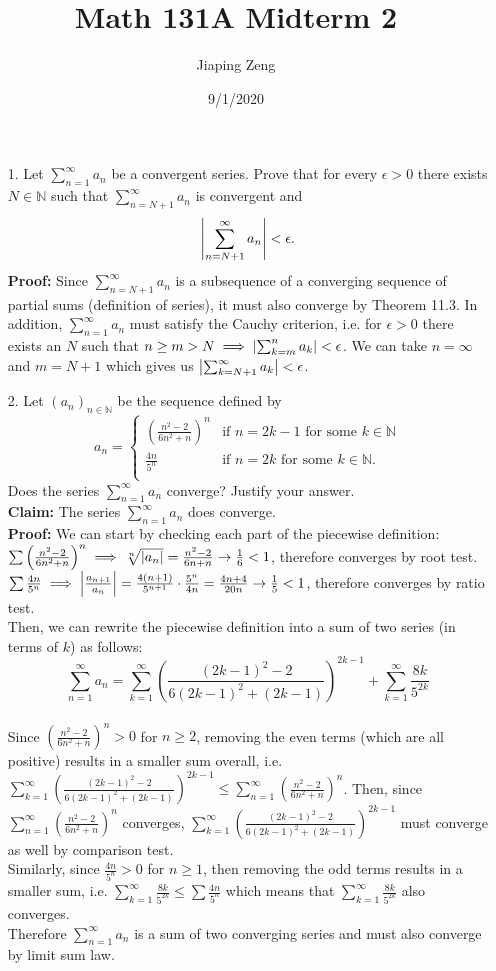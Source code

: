 \documentclass{article}
\title{Math 131A Midterm 2}
\author{Jiaping Zeng}
\date{9/1/2020}
\begin{document}
\begin{itemize}
    \item [1.] Let $\sum_{n=1}^\infty a_n$ be a convergent series. Prove that for every $\epsilon>0$ there exists $N\in\mathbb{N}$ such that $\sum_{n=N+1}^\infty a_n$ is convergent and \[\abs{\sum_{n=N+1}^\infty a_n}<\epsilon.\]
          \textbf{Proof: } Since $\sum_{n=N+1}^\infty a_n$ is a subsequence of a converging sequence of partial sums (definition of series), it must also converge by Theorem 11.3. In addition, $\sum_{n=1}^\infty a_n$ must satisfy the Cauchy criterion, i.e. for $\epsilon>0$ there exists an $N$ such that $n\geq m>N\implies\abs{\sum_{k=m}^na_k}<\epsilon$. We can take $n=\infty$ and $m=N+1$ which gives us $\abs{\sum_{k=N+1}^\infty a_k}<\epsilon$.
\end{itemize}
\newpage
\begin{itemize}
    \item [2.] Let $(a_n)_{n\in\mathbb{N}}$ be the sequence defined by \[a_n=\begin{cases}\left(\frac{n^2-2}{6n^2+n}\right)^n & \text{if } n=2k-1\text{ for some }k\in\mathbb{N} \\\frac{4n}{5^n} & \text{if } n=2k\text{ for some }k\in\mathbb{N}.\\\end{cases}\] Does the series $\sum_{n=1}^\infty a_n$ converge? Justify your answer.\\
          \textbf{Claim: } The series $\sum_{n=1}^\infty a_n$ does converge.\\
          \textbf{Proof: } We can start by checking each part of the piecewise definition:\\$\sum\left(\frac{n^2-2}{6n^2+n}\right)^n\implies\sqrt[n]{\abs{a_n}}=\frac{n^2-2}{6n+n}\rightarrow\frac{1}{6}<1$, therefore converges by root test.\\$\sum\frac{4n}{5^n}\implies\abs{\frac{a_{n+1}}{a_n}}=\frac{4(n+1)}{5^{n+1}}\cdot\frac{5^n}{4n}=\frac{4n+4}{20n}\rightarrow\frac{1}{5}<1$, therefore converges by ratio test.\\Then, we can rewrite the piecewise definition into a sum of two series (in terms of $k$) as follows:\\\[\sum_{n=1}^\infty a_n=\sum_{k=1}^\infty \left(\frac{(2k-1)^2-2}{6(2k-1)^2+(2k-1)}\right)^{2k-1}+\sum_{k=1}^\infty\frac{8k}{5^{2k}}\]\\Since $\left(\frac{n^2-2}{6n^2+n}\right)^n>0$ for $n\geq 2$, removing the even terms (which are all positive) results in a smaller sum overall, i.e. $\sum_{k=1}^\infty\left(\frac{(2k-1)^2-2}{6(2k-1)^2+(2k-1)}\right)^{2k-1}\leq\sum_{n=1}^\infty\left(\frac{n^2-2}{6n^2+n}\right)^n$. Then, since $\sum_{n=1}^\infty\left(\frac{n^2-2}{6n^2+n}\right)^n$ converges, $\sum_{k=1}^\infty\left(\frac{(2k-1)^2-2}{6(2k-1)^2+(2k-1)}\right)^{2k-1}$ must converge as well by comparison test.\\Similarly, since $\frac{4n}{5^n}>0$ for $n\geq 1$, then removing the odd terms results in a smaller sum, i.e. $\sum_{k=1}^\infty\frac{8k}{5^{2k}}\leq\sum\frac{4n}{5^n}$ which means that $\sum_{k=1}^\infty\frac{8k}{5^{2k}}$ also converges.\\Therefore $\sum_{n=1}^\infty a_n$ is a sum of two converging series and must also converge by limit sum law.

\end{itemize}
\end{document}
